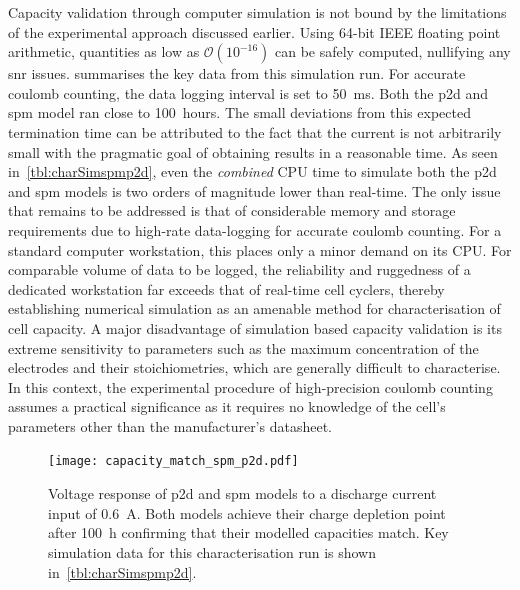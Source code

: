 Capacity validation through computer simulation  is not bound by the limitations
of the experimental approach discussed earlier. Using 64-bit IEEE floating point
arithmetic, quantities as low as $\mathcal{O}(10^{-16})$ can be safely computed,
nullifying  any \gls{snr}  issues.   summarises the  key
data  from  this  simulation  run.  For  accurate  coulomb  counting,  the  data
logging  interval  is set  to  \SI{50}{\milli\second}.  Both the  \gls{p2d}  and
\gls{spm} model ran close to 100~hours.  The small deviations from this expected
termination  time  can  be attributed  to  the  fact  that  the current  is  not
arbitrarily small with  the pragmatic goal of obtaining results  in a reasonable
time. As seen in~\cref{tbl:charSimspmp2d}, even  the \emph{combined} CPU time to
simulate both  the \gls{p2d}  and \gls{spm}  models is  two orders  of magnitude
lower than  real-time. The only  issue that remains to  be addressed is  that of
considerable memory and  storage requirements due to  high-rate data-logging for
accurate coulomb counting. For a standard computer workstation, this places only
a minor  demand on  its CPU.  For comparable volume  of data  to be  logged, the
reliability  and ruggedness  of  a  dedicated workstation  far  exceeds that  of
real-time cell cyclers, thereby establishing numerical simulation as an amenable
method for characterisation of cell capacity. A major disadvantage of simulation
based capacity validation  is its extreme sensitivity to parameters  such as the
maximum concentration  of the  electrodes and  their stoichiometries,  which are
generally difficult to characterise. In this context, the experimental procedure
of  high-precision  coulomb counting  assumes  a  practical significance  as  it
requires no  knowledge of  the cell's parameters  other than  the manufacturer's
datasheet.

\begin{figure}[!htb]
    \centering
    \texttt{[image: capacity\_match\_spm\_p2d.pdf]}
    \caption[Voltage response of  and  models
    for capacity validation]{Voltage response of \gls{p2d} and \gls{spm} models
        to a discharge current input of \SI{0.6}{A}. Both models achieve their
        charge depletion point after \approx\SI{100}{\hour} confirming that
        their modelled capacities match. Key simulation data for this
    characterisation run is shown in~\cref{tbl:charSimspmp2d}.}
    \label{fig:capcharspmp2d}
\end{figure}

